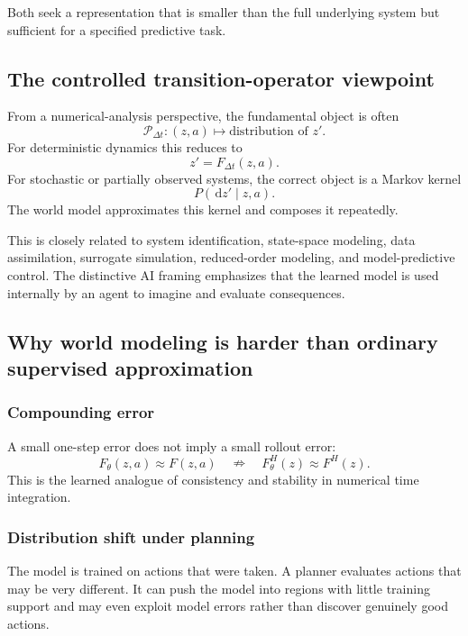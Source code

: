\documentclass[11pt]{article}
\newcommand{\Pcal}{\mathcal{P}}
\newcommand{\dd}{\,\mathrm{d}}
\begin{document}
Both seek a representation that is smaller than the full underlying system but sufficient for a specified predictive task.

\subsection{The controlled transition-operator viewpoint}

From a numerical-analysis perspective, the fundamental object is often
\begin{equation}
 \Pcal_{\Delta t}:(z,a)
 \longmapsto
 \text{distribution of }z'.
\end{equation}
For deterministic dynamics this reduces to
\[
 z'=F_{\Delta t}(z,a).
\]
For stochastic or partially observed systems, the correct object is a Markov kernel
\[
 P(\dd z'\mid z,a).
\]
The world model approximates this kernel and composes it repeatedly.

This is closely related to system identification, state-space modeling, data assimilation, surrogate simulation, reduced-order modeling, and model-predictive control. The distinctive AI framing emphasizes that the learned model is used internally by an agent to imagine and evaluate consequences.

\subsection{Why world modeling is harder than ordinary supervised approximation}

\subsubsection{Compounding error}

A small one-step error does not imply a small rollout error:
\[
 F_\theta(z,a)\approx F(z,a)
 \quad\nRightarrow\quad
 F_\theta^{H}(z)\approx F^{H}(z).
\]
This is the learned analogue of consistency and stability in numerical time integration.

\subsubsection{Distribution shift under planning}

The model is trained on actions that were taken. A planner evaluates actions that may be very different. It can push the model into regions with little training support and may even exploit model errors rather than discover genuinely good actions.
\end{document}
